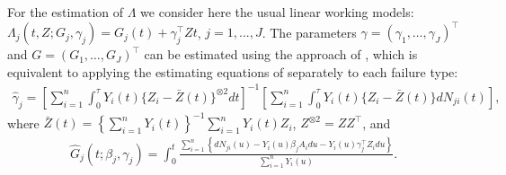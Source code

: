 \documentclass[11pt]{article}
\newcommand{\ee}{\end{eqnarray}}
\newcommand{\be}{\begin{eqnarray}}
\begin{document}
For the estimation of $\Lambda$  we consider here the usual linear working models: 
$ \Lambda_{j}(t,Z; G_j, \gamma_j)=G_j(t)+\gamma_j^\top Zt$, $j=1, ..., J$.
The parameters $\gamma= (\gamma_1,\ldots,\gamma_J)^\top$ and $G= (G_1,\ldots,G_J)^\top$ can be estimated using the approach of 
 \cite{shen1999confidence}, which is equivalent to applying the estimating equations of \cite{ly} separately to each failure type:
\be\label{tradgamma}
\hat \gamma_j=\left[\sum_{i=1}^n \int_0^\tau Y_i(t)\{Z_i-\bar Z(t)\}^{\otimes 2}dt\right]^{-1}\left[\sum_{i=1}^n \int_0^\tau Y_i(t)\{Z_i-\bar Z(t)\}dN_{ji}(t)\right],
\ee
where $\bar{Z}(t)=\left\{\sum_{i=1}^n Y_i(t)\right\}^{-1}\sum_{i=1}^n Y_i(t)Z_i$, $Z^{\otimes 2}=Z Z^\top$, and 
\be\label{estbas1}
\hat G_j(t; \beta_j, \gamma_j)=\int_0^t\frac{\sum_{i=1}^n \left\{dN_{ji}(u)-Y_i(u)\beta_jA_idu-Y_i(u)\gamma_j^\top Z_idu\right\}}{\sum_{i=1}^nY_i(u)}.
\ee
\end{document}

